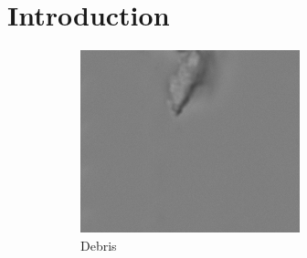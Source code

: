 
\chapter{Introduction}
\label{sec:Introduction}

\label{sub:figures}

\begin{figure}[ht]
	\begin{center}
		\begin{subfigure}[b]{0.33\textwidth}
			\includegraphics[width=\textwidth]{thesis-template-master/images/(1095).png}
			\caption{Debris}
			\label{fig:Debris}
		\end{subfigure}
		\begin{subfigure}[b]{0.33\textwidth}

\end{subfigure}
\end{center}
\end{figure}
